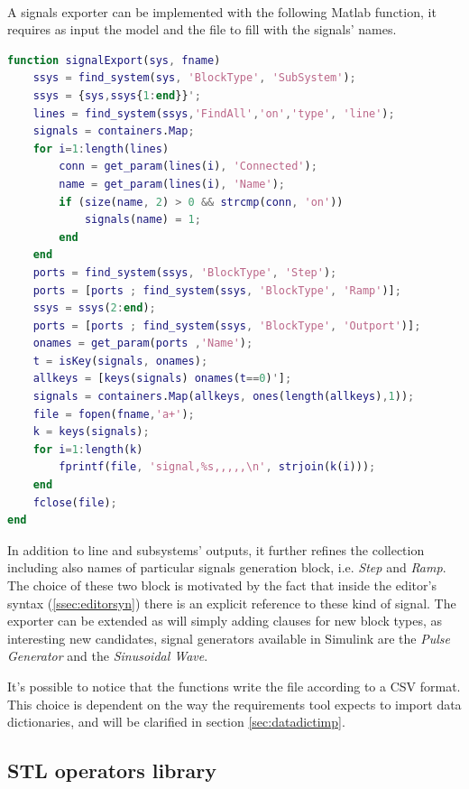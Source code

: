 \paragraph{} A signals exporter can be implemented with the following Matlab function, it requires as input the model and the file to fill with the signals' names. 
\begin{lstlisting}[language=MATLAB]
function signalExport(sys, fname)
    ssys = find_system(sys, 'BlockType', 'SubSystem');
    ssys = {sys,ssys{1:end}}';
    lines = find_system(ssys,'FindAll','on','type', 'line');
    signals = containers.Map;
    for i=1:length(lines)
        conn = get_param(lines(i), 'Connected');
        name = get_param(lines(i), 'Name');
        if (size(name, 2) > 0 && strcmp(conn, 'on'))
            signals(name) = 1;
        end
    end
    ports = find_system(ssys, 'BlockType', 'Step');
    ports = [ports ; find_system(ssys, 'BlockType', 'Ramp')];
    ssys = ssys(2:end);
    ports = [ports ; find_system(ssys, 'BlockType', 'Outport')];
    onames = get_param(ports ,'Name');
    t = isKey(signals, onames);
    allkeys = [keys(signals) onames(t==0)'];
    signals = containers.Map(allkeys, ones(length(allkeys),1));
    file = fopen(fname,'a+');
    k = keys(signals);
    for i=1:length(k)
        fprintf(file, 'signal,%s,,,,,\n', strjoin(k(i)));
    end
    fclose(file);
end
\end{lstlisting}
In addition to line and subsystems' outputs, it further refines the collection including also names of particular signals generation block, i.e. \textit{Step} and \textit{Ramp}. The choice of these two block is motivated by the fact that inside the editor's syntax (\ref{ssec:editorsyn}) there is an explicit reference to these kind of signal. The exporter can be extended as will simply adding clauses for new block types, as interesting new candidates, signal generators available in Simulink are the \textit{Pulse Generator} and the \textit{Sinusoidal Wave}.
\par It's possible to notice that the functions write the file according to a CSV format. This choice is dependent on the way the requirements tool expects to import data dictionaries, and will be clarified in section \ref{sec:datadictimp}.

\subsection{STL operators library}
\label{ssec:STLib}

